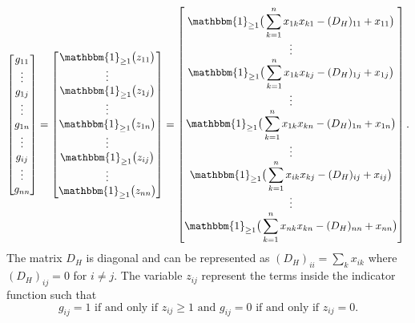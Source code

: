 \documentclass[11pt]{article}
\begin{document}
\begin{equation}  \label{eq::fund_programming_equation}
\begin{bmatrix}
g_{11} \\
\vdots \\
g_{1j} \\
\vdots \\
g_{1n} \\
\vdots \\
g_{ij} \\
\vdots \\
g_{nn}
\end{bmatrix} 
=
\begin{bmatrix}
\mathbbm{1}_{\geq 1}\big(z_{11}\big) \\
\vdots \\
\mathbbm{1}_{\geq 1}\big(z_{1j}\big) \\
\vdots \\
\mathbbm{1}_{\geq 1}\big(z_{1n}\big) \\
\vdots \\
\mathbbm{1}_{\geq 1}\big(z_{ij}\big) \\
\vdots \\
\mathbbm{1}_{\geq 1}\big(z_{nn}\big)
\end{bmatrix}
=
\begin{bmatrix} \displaystyle
\mathbbm{1}_{\geq 1}\big(\sum_{k=1}^n x_{1k}x_{k1} - (D_H)_{11} + x_{11} \big) \\
\vdots \\ \displaystyle
\mathbbm{1}_{\geq 1}\big(\sum_{k=1}^n x_{1k}x_{kj} - (D_H)_{1j} + x_{1j} \big) \\
\vdots \\ \displaystyle
\mathbbm{1}_{\geq 1}\big(\sum_{k=1}^n x_{1k}x_{kn} - (D_H)_{1n} + x_{1n} \big)\\
\vdots \\ \displaystyle
\mathbbm{1}_{\geq 1}\big(\sum_{k=1}^n x_{ik}x_{kj} - (D_H)_{ij} + x_{ij} \big)\\
\vdots \\ \displaystyle
\mathbbm{1}_{\geq 1}\big(\sum_{k=1}^n x_{nk}x_{kn} - (D_H)_{nn} + x_{nn} \big)
\end{bmatrix}.
\end{equation}
The matrix $D_H$ is diagonal and can be represented as $\displaystyle (D_H)_{ii} = \sum_{k} x_{ik}$ where $(D_H)_{ij} = 0$ for $i \neq j$. The variable $z_{ij}$ represent the terms inside the indicator function such that
\[
g_{ij} = 1 \text{ if and only if } z_{ij} \geq 1 \text{ and } g_{ij} = 0 \text{ if and only if } z_{ij} = 0.
\]  
\end{document}
